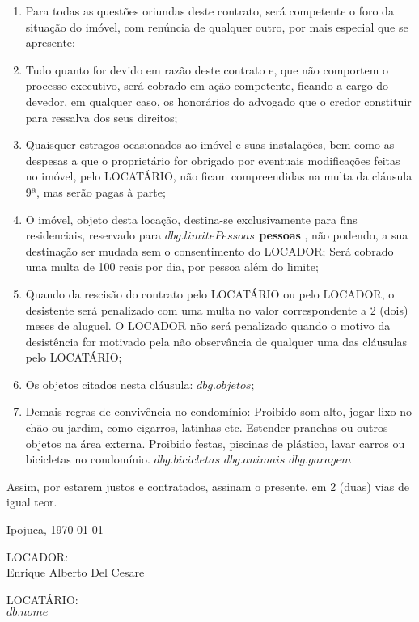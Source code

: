 \documentclass[a4paper,12pt]{article}
\begin{document}
\begin{enumerate}
\item Para todas as questões oriundas deste contrato, será competente o foro da situação do imóvel, com renúncia de qualquer outro, por mais especial que se apresente;
\item Tudo quanto for devido em razão deste contrato e, que não comportem o processo executivo, será cobrado em ação competente, ficando a cargo do devedor, em qualquer caso, os honorários do advogado que o credor constituir para ressalva dos seus direitos;
\item Quaisquer estragos ocasionados ao imóvel e suas instalações, bem como as despesas a que o proprietário for obrigado por eventuais modificações feitas no imóvel, pelo LOCATÁRIO, não ficam compreendidas na multa da cláusula 9ª, mas serão pagas à parte;
\item O imóvel, objeto desta locação, destina-se exclusivamente para fins residenciais, 
reservado para \textbf{ ${dbg.limitePessoas}$ pessoas },  não podendo, a sua destinação ser mudada sem o consentimento do LOCADOR;
Será cobrado uma multa de 100 reais por dia, por pessoa além do limite;
\item Quando da rescisão do contrato pelo LOCATÁRIO  ou pelo LOCADOR, o desistente será penalizado com uma multa no valor correspondente a 2 (dois) meses de aluguel. O LOCADOR não será penalizado quando o motivo da desistência for motivado pela não observância de qualquer uma das cláusulas pelo LOCATÁRIO;
\item Os objetos citados nesta cláusula: ${dbg.objetos}$;
\item Demais regras de convivência no condomínio: Proibido som alto, jogar lixo no chão ou jardim, como cigarros, latinhas etc. 
Estender pranchas ou outros objetos na área externa.
Proibido festas, piscinas de plástico, lavar carros ou bicicletas no condomínio.
${dbg.bicicletas}$ ${dbg.animais}$ ${dbg.garagem}$

\end{enumerate}
Assim, por estarem justos e contratados, assinam o presente, em 2 (duas) vias de igual teor.

\begin{flushright}
Ipojuca, \today
\end{flushright}

\begin{center}

\vspace{2cm}

LOCADOR: \hrulefill
\\Enrique Alberto Del Cesare

\vspace{2.5cm}

LOCATÁRIO: \hrulefill
\\${db.nome}$
 \end{center}
\end{document}
